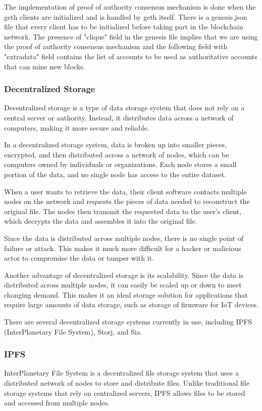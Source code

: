 \documentclass{article}
\begin{document}
The implementation of proof of authority consensus mechanism is done when the geth clients are initialized and is handled by geth itself. There is a genesis.json file that every client has to be initialized before taking part in the blockchain network. The presence of "clique" field in the genesis file implies that we are using the proof of authority consensus mechanism and the following field with "extradata" field contains the list of accounts to be used as authoritative accounts that can mine new blocks. 

\subsubsection{Decentralized Storage}
Decentralized storage is a type of data storage system that does not rely on a central server or authority. Instead, it distributes data across a network of computers, making it more secure and reliable.

In a decentralized storage system, data is broken up into smaller pieces, encrypted, and then distributed across a network of nodes, which can be computers owned by individuals or organizations. Each node stores a small portion of the data, and no single node has access to the entire dataset.

When a user wants to retrieve the data, their client software contacts multiple nodes on the network and requests the pieces of data needed to reconstruct the original file. The nodes then transmit the requested data to the user's client, which decrypts the data and assembles it into the original file.

Since the data is distributed across multiple nodes, there is no single point of failure or attack. This makes it much more difficult for a hacker or malicious actor to compromise the data or tamper with it.

Another advantage of decentralized storage is its scalability. Since the data is distributed across multiple nodes, it can easily be scaled up or down to meet changing demand. This makes it an ideal storage solution for applications that require large amounts of data storage, such as storage of firmware for IoT devices.

There are several decentralized storage systems currently in use, including IPFS (InterPlanetary File System)\cite{ipfsWhitepaper}, Storj\cite{storj}, and Sia\cite{sia}.

\subsubsection{IPFS}
InterPlanetary File System is a decentralized file storage system that uses a distributed network of nodes to store and distribute files. Unlike traditional file storage systems that rely on centralized servers, IPFS allows files to be stored and accessed from multiple nodes.
\end{document}
